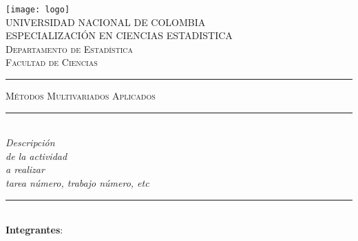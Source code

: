 



\begin{titlepage}

\newcommand{\HRule}{\rule{\linewidth}{0.5mm}} %

\center %


\begin{minipage}{13.5cm}
\center

\texttt{[image: logo]}\\[0.5cm] %


\textsc{\Large UNIVERSIDAD NACIONAL DE COLOMBIA \\[1.0cm]
{\large ESPECIALIZACIÓN EN CIENCIAS ESTADISTICA\\[0.5cm]
Departamento de Estadística\\[0.2cm]
Facultad de Ciencias}}\\[2cm]



\rule[1.7mm]{1cm}{0.5mm}
\hfill
\textsc{\Large Métodos Multivariados Aplicados}
\hfill
\rule[1.7mm]{1cm}{0.5mm}
\\[0.2cm]

{\Large
\textit{Descripción \\
de la actividad \\
a realizar \\
tarea número, trabajo número, etc}
}\\[0.2cm]

\HRule \\[1.5cm]

{\large \textbf{Integrantes}:\\[0.3cm]

}
\end{minipage}
\end{titlepage}
